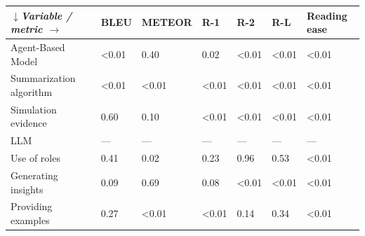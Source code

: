 \begin{tabular}{|l|l|l|l|l|l|l|}
\hline
\textit{$\downarrow$Variable / metric $\rightarrow$} & BLEU & METEOR & R-1 & R-2 & R-L & Reading ease \\
 \hline
 Agent-Based Model & \textless{}0.01 & 0.40 & 0.02 & \textless{}0.01 & \textless{}0.01 & \textless{}0.01 \\
 \hline
 Summarization algorithm & \textless{}0.01 & \textless{}0.01 & \textless{}0.01 & \textless{}0.01 & \textless{}0.01 & \textless{}0.01 \\
 \hline
 Simulation evidence & 0.60 & 0.10 & \textless{}0.01 & \textless{}0.01 & \textless{}0.01 & \textless{}0.01 \\
 \hline
 LLM & — & — & — & — & — & — \\
 \hline
 Use of roles & 0.41 & 0.02 & 0.23 & 0.96 & 0.53 & \textless{}0.01 \\
 \hline
 Generating insights & 0.09 & 0.69 & 0.08 & \textless{}0.01 & \textless{}0.01 & \textless{}0.01 \\
 \hline
 Providing examples & 0.27 & \textless{}0.01 & \textless{}0.01 & 0.14 & 0.34 & \textless{}0.01 \\
\hline
\end{tabular}
